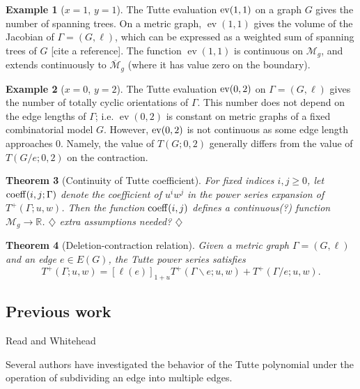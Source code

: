 \documentclass{amsart}
\newtheorem{thm}{Theorem}
\theoremstyle{definition}
\newtheorem{eg}[thm]{Example}
\newcommand{\RR}{\mathbb{R}}
\DeclareMathOperator{\ev}{ev}
\newcommand{\harry}[1]{{\color{red} \sf $\diamondsuit$  {#1} $\diamondsuit$ }}
\newcommand{\note}[1]{\harry{#1}}
\begin{document}
\begin{eg}
[$x = 1$, $y=1$]
The Tutte evaluation ${\rm ev}(1,1)$ 
on a graph $G$ gives the number of spanning trees.
On a metric graph, $\ev(1,1)$ gives the volume of the Jacobian of
$\Gamma = (G,\ell)$,
which can be expressed as a weighted sum of spanning trees of $G$ [cite a reference].
The function $\ev(1,1)$ is continuous on $\mathcal M_g$, 
and extends continuously to $\overline{\mathcal M}_g$ 
(where it has value zero on the boundary).
\end{eg}
\begin{eg}
[$x = 0$, $y=2$]
The Tutte evaluation ${\rm ev}(0,2)$ 
on $\Gamma = (G,\ell)$ gives the number of totally cyclic orientations of $\Gamma$.
This number does not depend on the edge lengths of $\Gamma$;
i.e. $\ev(0,2)$
 is constant on metric graphs %
of a fixed combinatorial model $G$.
However, ${\rm ev}(0,2)$ is not continuous as some edge length approaches $0$.
Namely, the value of $T(G; 0, 2)$ generally differs from the value of $T(G/e; 0,2)$
on the contraction.
\end{eg}

\begin{thm}[Continuity of Tutte coefficient]
For fixed indices $i,j\geq 0$,
let ${\rm coeff}(i,j; \Gamma)$
denote the coefficient of $u^i w^j$ in the power series expansion of $T^+(\Gamma; u,w)$.
Then the function ${\rm coeff}(i,j)$
defines a continuous(?) 
function $\mathcal M_g \to \RR$.
\note{extra assumptions needed?}
\end{thm}

\begin{thm}[Deletion-contraction relation]
Given a metric graph $\Gamma = (G,\ell)$ and an edge $e \in E(G)$,
the Tutte power series satisfies
\begin{equation*}
T^+(\Gamma; u,w) = [\ell(e)]_{1+u} T^+(\Gamma \backslash e; u,w) + T^+(\Gamma / e; u,w).
\end{equation*}
\end{thm}

\subsection{Previous work} 

Read and Whitehead \cite{RW2}

Several authors have investigated the behavior of the Tutte polynomial under the operation of subdividing an edge into multiple edges.

\cite{Tra1,Tra2,Tra3}
\end{document}

